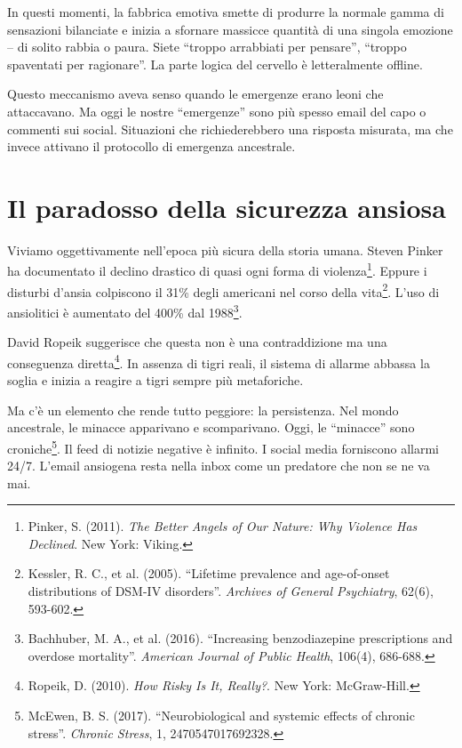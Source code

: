 In questi momenti, la fabbrica emotiva smette di produrre la normale gamma di sensazioni bilanciate e inizia a sfornare massicce quantità di una singola emozione -- di solito rabbia o paura. Siete ``troppo arrabbiati per pensare'', ``troppo spaventati per ragionare''. La parte logica del cervello è letteralmente offline.

Questo meccanismo aveva senso quando le emergenze erano leoni che attaccavano. Ma oggi le nostre ``emergenze'' sono più spesso email del capo o commenti sui social. Situazioni che richiederebbero una risposta misurata, ma che invece attivano il protocollo di emergenza ancestrale.

\section{Il paradosso della sicurezza ansiosa}

Viviamo oggettivamente nell'epoca più sicura della storia umana. Steven Pinker ha documentato il declino drastico di quasi ogni forma di violenza\footnote{Pinker, S. (2011). \textit{The Better Angels of Our Nature: Why Violence Has Declined}. New York: Viking.}. Eppure i disturbi d'ansia colpiscono il 31\% degli americani nel corso della vita\footnote{Kessler, R. C., et al. (2005). ``Lifetime prevalence and age-of-onset distributions of DSM-IV disorders''. \textit{Archives of General Psychiatry}, 62(6), 593-602.}. L'uso di ansiolitici è aumentato del 400\% dal 1988\footnote{Bachhuber, M. A., et al. (2016). ``Increasing benzodiazepine prescriptions and overdose mortality''. \textit{American Journal of Public Health}, 106(4), 686-688.}.

David Ropeik suggerisce che questa non è una contraddizione ma una conseguenza diretta\footnote{Ropeik, D. (2010). \textit{How Risky Is It, Really?}. New York: McGraw-Hill.}. In assenza di tigri reali, il sistema di allarme abbassa la soglia e inizia a reagire a tigri sempre più metaforiche.

Ma c'è un elemento che rende tutto peggiore: la persistenza. Nel mondo ancestrale, le minacce apparivano e scomparivano. Oggi, le ``minacce'' sono croniche\footnote{McEwen, B. S. (2017). ``Neurobiological and systemic effects of chronic stress''. \textit{Chronic Stress}, 1, 2470547017692328.}. Il feed di notizie negative è infinito. I social media forniscono allarmi 24/7. L'email ansiogena resta nella inbox come un predatore che non se ne va mai.

